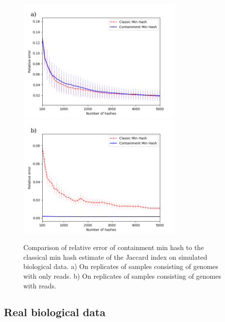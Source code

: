 \documentclass[11pt]{amsart}
\theoremstyle{remark}
\numberwithin{equation}{section}
\newcommand{\themethod}{containment min hash }
\begin{document}
\begin{figure}[!h]%
\begin{center}
\includegraphics[width=3.25in,trim={0 0 0 0in},clip]{Figs/SimulatedBiologicalData_small.png}%
\includegraphics[width=3.25in,trim={0 0 0 0in},clip]{Figs/SimulatedBiologicalData.png}
\end{center}
\caption{Comparison of relative error of \themethod to the classical min hash estimate of the Jaccard index on simulated biological data. a) On \protect replicates of samples consisting of \protect genomes with only  \protect reads. b) On \protect replicates of samples consisting of \protect genomes with \protect reads.
}
\label{fig:SimulatedBiologicalData}%
\end{figure}

\subsection{Real biological data}
\end{document}

